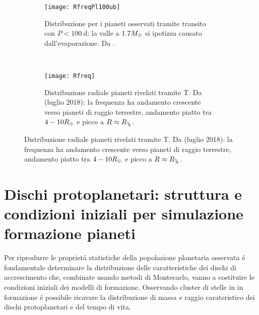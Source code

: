 
\begin{figure}[!ht]
\begin{subfigure}[b]{0.49\textwidth}
	\centering \texttt{[image: RfreqPl100ub]} 
	\caption{Distribuzione per i pianeti osservati tramite transito con $P<\SI{100}{\day}$: la valle a $1.7M_{\oplus}{}$ si ipotizza causato dall'evaporazione. Da \cite{fulton2017california}.}\label{fig:RfreqPl100ub}
\end{subfigure}
~
\begin{subfigure}[b]{0.39\textwidth}
	\centering\texttt{[image: Rfreq]}\caption{Distribuzione radiale pianeti rivelati tramite T. Da \cite{exoplanet.eu} (luglio 2018): la frequenza ha andamento crescente verso pianeti di raggio terrestre, andamento piatto tra $4-10R_{\oplus}{}$ e picco a $R\approx\rjupiter{}$.}\label{fig:probvsR-T}
\end{subfigure}
\end{figure}

\begin{workout}

\end{workout}


{\let\clearpage\relax\let\cleardoublepage\relax
	\chapter{Dischi protoplanetari: struttura e condizioni iniziali per simulazione formazione pianeti}
}

Per riprodurre le propriet\'a statistiche della popolazione planetaria osservata \'e fondamentale determinare la distribuzione delle caratteristiche dei dischi di accrescimento che, combinate usando metodi di Montecarlo, vanno a costituire le condizioni iniziali dei modelli di formazione. Osservando cluster di stelle in in formazione \'e possibile ricavare la distribuzione di massa e raggio carateristico dei dischi protoplanetari e del tempo di vita.

